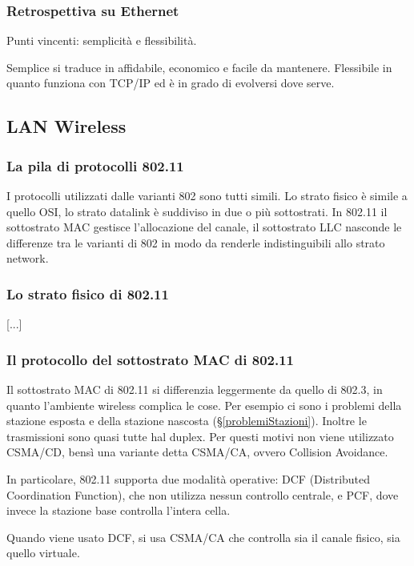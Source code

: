 \subsubsection{Retrospettiva su Ethernet}
Punti vincenti: semplicità e flessibilità.

Semplice si traduce in affidabile, economico e facile da mantenere.
Flessibile in quanto funziona con TCP/IP ed è in grado di evolversi dove serve.

\subsection{LAN Wireless} %

\subsubsection{La pila di protocolli 802.11}
I protocolli utilizzati dalle varianti 802 sono tutti simili.
Lo strato fisico è simile a quello OSI, lo strato datalink è suddiviso in due o più sottostrati.
In 802.11 il sottostrato MAC gestisce l'allocazione del canale, il sottostrato LLC nasconde le differenze tra le varianti di 802 in modo da renderle indistinguibili allo strato network.

\subsubsection{Lo strato fisico di 802.11}
[...]

\subsubsection{Il protocollo del sottostrato MAC di 802.11}
Il sottostrato MAC di 802.11 si differenzia leggermente da quello di 802.3, in quanto l'ambiente wireless complica le cose.
Per esempio ci sono i problemi della stazione esposta e della stazione nascosta (§\ref{problemiStazioni}).
Inoltre le trasmissioni sono quasi tutte hal duplex.
Per questi motivi non viene utilizzato CSMA/CD, bensì una variante detta CSMA/CA, ovvero Collision Avoidance.

In particolare, 802.11 supporta due modalità operative: 
DCF (Distributed Coordination Function), che non utilizza nessun controllo centrale,
e PCF, dove invece la stazione base controlla l'intera cella.

Quando viene usato DCF, si usa CSMA/CA che controlla sia il canale fisico, sia quello virtuale.

